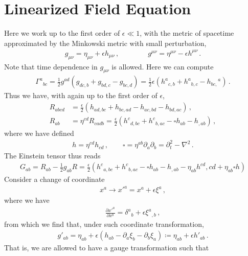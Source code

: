 \documentclass[11pt, onesided]{book}
\theoremstyle{break}
\theoremstyle{break}
\newcommand{\pd}{\partial}
\begin{document}
\section[Linearized Field Equation]{\color{red}Linearized Field Equation\color{black}}
Here we work up to the first order of $\epsilon \ll 1$, with the metric of spacetime approximated by the Minkowski metric with small perturbation, 
\begin{align*}
g_{\mu\nu} = \eta_{\mu\nu} + \epsilon h_{\mu\nu}\,,\qquad\qquad
g^{\mu\nu} = \eta^{\mu\nu} - \epsilon h^{\mu\nu}
\,.
\end{align*}
Note that time dependence in $g_{\mu\nu}$ is allowed. Here we can compute
\begin{align*}
\Gamma^{a}{}_{bc} = \frac{1}{2}g^{ad}\left( g_{dc,b} + g_{bd,c} -g_{bc,d}\right) = \frac{1}{2}\epsilon\left( h^{a}{}_{c,b} + h^a{}_{b,c} - h_{bc,}{}^a\right)\,.
\end{align*}
Thus we have, with again up to the first order of $\epsilon$, 
\begin{align*}
R_{abcd} &= \frac{\epsilon}{2}\left( h_{ad,bc} + h_{bc,ad} - h_{ac,bd} - h_{bd,ac}\right)\,,\\
R_{ab} &= \eta^{cd}R_{cadb} = \frac{\epsilon}{2}\left(h^c{}_{d,bc} + h^c{}_{b,ac} - \square h_{ab} - h_{,ab} \right)\,,
\end{align*}
where we have defined
\begin{align*}
h = \eta^{cd}h_{cd}\,,\qquad \square = \eta^{ab}\pd_a\pd_b = \pd_t^2 - \nabla^2\,.
\end{align*}
The Einstein tensor thus reads
\begin{align*}
G_{ab} = R_{ab} - \frac{1}{2}g_{ab}R= \frac{\epsilon}{2}\left( 
h^c{}_{a,bc} + h^c{}_{b,ac} - \square h_{ab} - h_{,ab} - \eta_{ab}h^{cd}{,cd} + \eta_{ab}\square h\right)
\end{align*}
Consider a change of coordinate
\begin{align*}
x^a \to x'^a = x^a + \epsilon \xi^a\,,
\end{align*}
where we have
\begin{align*}
\frac{\pd x'^a}{\pd x^b} = \delta^a{}_b + \epsilon \xi^a{}_{,b}\,,
\end{align*}
from which we find that, under such coordinate transformation,
\begin{align*}
g'_{ab} = \eta_{ab} + \epsilon( h_{ab} - \pd_a\xi_b - \pd_b \xi_a) \coloneqq \eta_{ab} + \epsilon h'_{ab}\,.
\end{align*}
That is, we are allowed to have a gauge transformation such that
\end{document}

